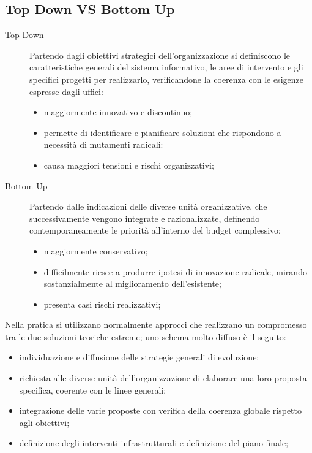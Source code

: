 \subsection{Top Down VS Bottom Up}\label{sub:obiettivi_top_down_vs_bottom_up} %
\begin{description}
    \item[Top Down] Partendo dagli obiettivi strategici dell'organizzazione si definiscono le caratteristiche generali del sistema informativo, le aree di intervento e gli specifici progetti per realizzarlo, verificandone la coerenza con le esigenze espresse dagli uffici:
        \begin{itemize}
            \item maggiormente innovativo e discontinuo;
            \item permette di identificare e pianificare soluzioni che rispondono a necessità di mutamenti radicali:
            \item causa maggiori tensioni e rischi organizzativi;
        \end{itemize}
    \item[Bottom Up] Partendo dalle indicazioni delle diverse unità organizzative, che successivamente vengono integrate e razionalizzate, definendo contemporaneamente le priorità all'interno del budget complessivo:
        \begin{itemize}
            \item maggiormente conservativo;
            \item difficilmente riesce a produrre ipotesi di innovazione radicale, mirando sostanzialmente al miglioramento dell'esistente;
            \item presenta casi rischi realizzativi;
        \end{itemize}
\end{description}
\begin{note}
    Nella pratica si utilizzano normalmente approcci che realizzano un compromesso tra le due soluzioni teoriche estreme; uno schema molto diffuso è il seguito:
    \begin{itemize}
        \item individuazione e diffusione delle strategie generali di evoluzione;
        \item richiesta alle diverse unità dell'organizzazione di elaborare una loro proposta specifica, coerente con le linee generali;
        \item integrazione delle varie proposte con verifica della coerenza globale rispetto agli obiettivi;
        \item definizione degli interventi infrastrutturali e definizione del piano finale;
    \end{itemize}
\end{note}

